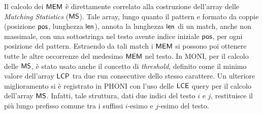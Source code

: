 \documentclass[a4paper,11pt, oneside,italian]{article}
\def\LCE{\mbox{\rm {\sf LCE}}}
\def\len{\mbox{\rm {\sf len}}}
\def\pos{\mbox{\rm {\sf pos}}}
\def\LCP{\mbox{\rm {\sf LCP}}}
\def\MEM{\mbox{\rm {\sf MEM}}}
\def\MS{\mbox{\rm {\sf MS}}}
\def\LCP{\mbox{\rm {\sf LCP}}}
\def\LCE{\mbox{\rm {\sf LCE}}}
\begin{document}
Il calcolo dei $\MEM$ è direttamente
correlato alla costruzione dell'array delle \textit{Matching Statistics}
($\MS$). Tale array, lungo quanto il pattern e formato da coppie (posizione
$\pos$, lunghezza $\len$), annota la lunghezza
$\len$ di un match, anche non massimale, con una sottostringa nel testo avente
indice iniziale $\pos$, per ogni posizione del pattern.
Estraendo da tali match i $\MEM$ si possono poi ottenere
tutte le altre occorrenze del medesimo $\MEM$ nel testo. 
In MONI, per il calcolo delle $\MS$, è stato
usato anche il concetto di \textit{threshold}, definito come
il minimo valore dell'array $\LCP$ tra due run consecutive dello stesso
carattere. Un ulteriore miglioramento si è registrato in PHONI con
l'uso delle $\LCE$ query per il calcolo dell'array $\MS$. Infatti, tale
struttura, dati due indici del testo $i$ e $j$, restituisce il più lungo
prefisso comune tra i suffissi $i$-esimo e $j$-esimo del testo.


\end{document}
